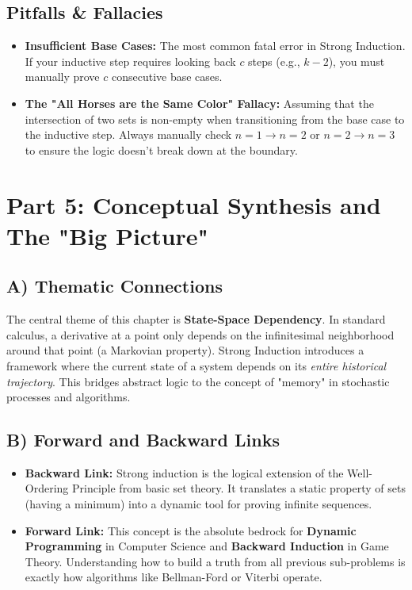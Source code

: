\documentclass[11pt, a4paper]{article}
\theoremstyle{definition}
\theoremstyle{remark}
\begin{document}
\subsection{Pitfalls \& Fallacies}
\begin{itemize}
    \item \textbf{Insufficient Base Cases:} The most common fatal error in Strong Induction. If your inductive step requires looking back $c$ steps (e.g., $k-2$), you must manually prove $c$ consecutive base cases.
    \item \textbf{The "All Horses are the Same Color" Fallacy:} Assuming that the intersection of two sets is non-empty when transitioning from the base case to the inductive step. Always manually check $n=1 \to n=2$ or $n=2 \to n=3$ to ensure the logic doesn't break down at the boundary.
\end{itemize}

\section{Part 5: Conceptual Synthesis and The "Big Picture"}

\subsection{A) Thematic Connections}
The central theme of this chapter is \textbf{State-Space Dependency}. In standard calculus, a derivative at a point only depends on the infinitesimal neighborhood around that point (a Markovian property). Strong Induction introduces a framework where the current state of a system depends on its \textit{entire historical trajectory}. This bridges abstract logic to the concept of "memory" in stochastic processes and algorithms.

\subsection{B) Forward and Backward Links}
\begin{itemize}
    \item \textbf{Backward Link:} Strong induction is the logical extension of the Well-Ordering Principle from basic set theory. It translates a static property of sets (having a minimum) into a dynamic tool for proving infinite sequences.
    \item \textbf{Forward Link:} This concept is the absolute bedrock for \textbf{Dynamic Programming} in Computer Science and \textbf{Backward Induction} in Game Theory. Understanding how to build a truth from all previous sub-problems is exactly how algorithms like Bellman-Ford or Viterbi operate.
\end{itemize}
\end{document}

